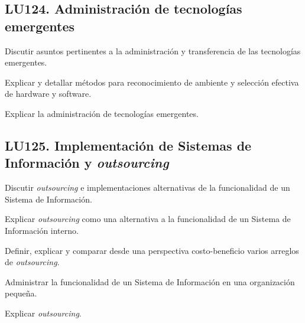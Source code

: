 \subsection{LU124. Administración de tecnologías emergentes}\label{sec:LU124}
\begin{LearningUnit}
\begin{LUGoal}
\item Discutir asuntos pertinentes a la administración y transferencia de las tecnologías emergentes.
\end{LUGoal}

\begin{LUObjective}
\item Explicar y detallar métodos para reconocimiento de ambiente y selección efectiva de hardware y software.
\item Explicar la administración de tecnologías emergentes.
\end{LUObjective}
\end{LearningUnit}

\subsection{LU125. Implementación de Sistemas de Información y {\it outsourcing}}\label{sec:LU125}
\begin{LearningUnit}
\begin{LUGoal}
\item Discutir {\it outsourcing} e implementaciones alternativas de la funcionalidad de un Sistema de Información.
\end{LUGoal}

\begin{LUObjective}
\item Explicar {\it outsourcing} como una alternativa a la funcionalidad de un Sistema de Información interno.
\item Definir, explicar y comparar desde una perspectiva costo-beneficio varios arreglos de {\it outsourcing}.
\item Administrar la funcionalidad de un Sistema de Información en una organización pequeña.
\item Explicar {\it outsourcing}.
\end{LUObjective}
\end{LearningUnit}


